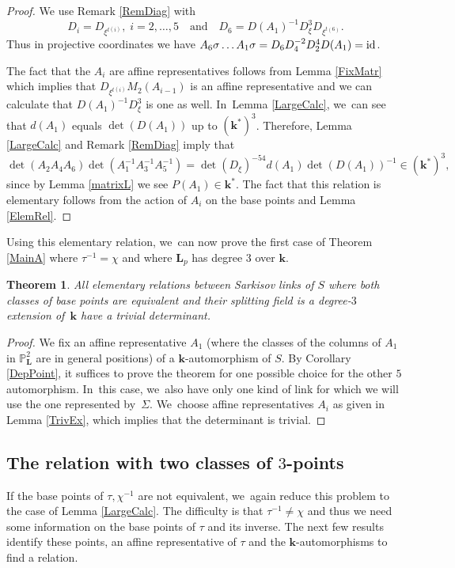 \documentclass[JEP,XML,SOM,Unicode,NoFloatCountersInSection, NoEqCountersInSection,published]{cedram}
\newcommand{\id}{\textup{id}}
\newcommand{\quand}{\quad\text{and}\quad}
\newtheorem{theorem}{Theorem}[section]
\theoremstyle{definition}
\newcommand{\kk}{{\boldsymbol{k}}}
\newcommand{\LL}{{\boldsymbol{L}}}
\begin{document}
\begin{proof}
We use Remark \ref{RemDiag} with
\[
D_i = D_{\xi^{t(i)}},\; i = 2, \dots , 5\quand D_6 = D(A_1)^{-1}D_{\xi}^3D_{\xi^{t(6)}}.
\]
Thus in projective coordinates we have $A_6 \sigma \dots A_1 \sigma = D_6 D_4^{-2}D_2^4 D(A_1) = \id$.

The fact that the $A_i$ are affine representatives follows from Lemma \ref{FixMatr} which implies that $D_{\xi^{t(i)}}M_2(A_{i-1})$ is an affine representative and we can calculate that $D(A_1)^{-1}D_{\xi}^3$ is one as well. In~Lemma \ref{LargeCalc}, we~can see that $d(A_1)$ equals $\det(D(A_1))$ up to $(\kk^*)^3$. Therefore, Lemma \ref{LargeCalc} and Remark \ref{RemDiag} imply that
\[
\det(A_2A_4A_6)\det(A_1^{-1}A_3^{-1}A_5^{-1}) = \det(D_{\xi})^{-54} d(A_1) \det(D(A_1))^{-1} \in (\kk^*)^3,
\]
since by Lemma \ref{matrixL} we see $P(A_1) \in \kk^*$. The fact that this relation is elementary follows from the action of $A_i$ on the base points and Lemma \ref{ElemRel}.
\end{proof}
Using this elementary relation, we~can now prove the first case of Theorem \ref{MainA} where $\tau^{-1} = \chi$ and where $\LL_p$ has degree $3$ over $\kk$.

\begin{theorem} \label{TrivialCase}
All elementary relations between Sarkisov links of $S$ where both classes of base points are equivalent and their splitting field is a degree-$3$ extension of~$\kk$ have a trivial determinant.
\end{theorem}

\begin{proof}
We fix an affine representative $A_1$ (where the classes of the columns of $A_1$ in $\mathbb{P}^2_{\LL}$ are in general positions) of a $\kk$-automorphism of $S$. By Corollary \ref{DepPoint}, it suffices to prove the theorem for one possible choice for the other $5$ automorphism. In~this case, we~also have only one kind of link for which we will use the one represented by~$\Sigma$. We~choose affine representatives $A_i$ as given in Lemma \ref{TrivEx}, which implies that the determinant is trivial.
\end{proof}

\subsection{The relation with two classes of $3$\nobreakdash-points}
If the base points of $\tau,\chi^{-1}$ are not equivalent, we~again reduce this problem to the case of Lemma \ref{LargeCalc}. The difficulty is that $\tau^{-1} \neq \chi$ and thus we need some information on the base points of $\tau$ and its inverse. The next few results identify these points, an affine representative of $\tau$ and the $\kk$-automorphisms to find a relation.
\end{document}
